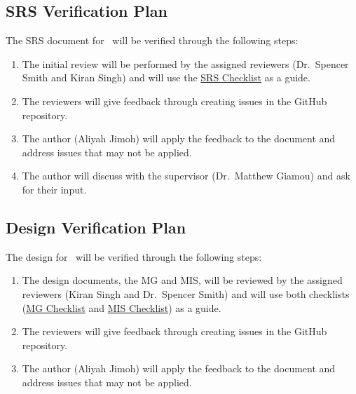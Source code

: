 \documentclass[12pt, titlepage]{article}
\begin{document}
\subsection{SRS Verification Plan}\label{plan_SRS}

The SRS document for \progname~will be verified through the following steps:
\begin{enumerate}
  \item The initial review will be performed by the assigned reviewers (Dr.~Spencer Smith and Kiran Singh) and will use the \href{https://github.com/AliyahJimoh/2D-Localizer/blob/main/docs/Checklists/SRS-Checklist.pdf}{SRS Checklist} as a guide.
  \item The reviewers will give feedback through creating issues in the GitHub repository.
  \item The author (Aliyah Jimoh) will apply the feedback to the document and address issues that may not be applied.
  \item The author will discuss with the supervisor (Dr.~Matthew Giamou) and ask for their input.
\end{enumerate}



\subsection{Design Verification Plan}\label{plan_design}
The design for \progname~will be verified through the following steps:
\begin{enumerate}
  \item The design documents, the MG and MIS, will be reviewed by the assigned reviewers (Kiran Singh and Dr.~Spencer Smith) and will use both checklists (\href{https://github.com/AliyahJimoh/2D-Localizer/blob/main/docs/Checklists/MG-Checklist.pdf}{MG Checklist} and \href{https://github.com/AliyahJimoh/2D-Localizer/blob/main/docs/Checklists/MIS-Checklist.pdf}{MIS Checklist}) as a guide.
  \item The reviewers will give feedback through creating issues in the GitHub repository.
  \item The author (Aliyah Jimoh) will apply the feedback to the document and address issues that may not be applied.
\end{enumerate}
\end{document}
